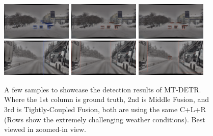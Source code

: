 \documentclass[report.tex]{subfiles}
\begin{document}
\begin{figure}[h!]
        \includegraphics[width=0.3\textwidth]{images/results/mtdetr/samples/snow_3/2018-02-12_10-07-06_00200_gt.png}
        \includegraphics[width=0.3\textwidth]{images/results/mtdetr/samples/snow_3/2018-02-12_10-07-06_00200_m_clr.png}
        \includegraphics[width=0.3\textwidth]{images/results/mtdetr/samples/snow_3/2018-02-12_10-07-06_00200_t_clr.png}
        \includegraphics[width=0.3\textwidth]{images/results/mtdetr/samples/snow_4/2018-02-12_11-00-35_00450_gt.png}
        \includegraphics[width=0.3\textwidth]{images/results/mtdetr/samples/snow_4/2018-02-12_11-00-35_00450_m_clr.png}
        \includegraphics[width=0.3\textwidth]{images/results/mtdetr/samples/snow_4/2018-02-12_11-00-35_00450_t_clr.png}
      
        \caption{A few samples to showcase the detection results of MT-DETR. Where the 1st column is ground truth, 2nd is Middle Fusion, and 3rd is Tightly-Coupled Fusion, both are using the same C+L+R (Rows show the extremely challenging weather conditions). Best viewed in zoomed-in view.}
        \label{fig:mtdetr_on_dense}
      \end{figure}
\end{document}
